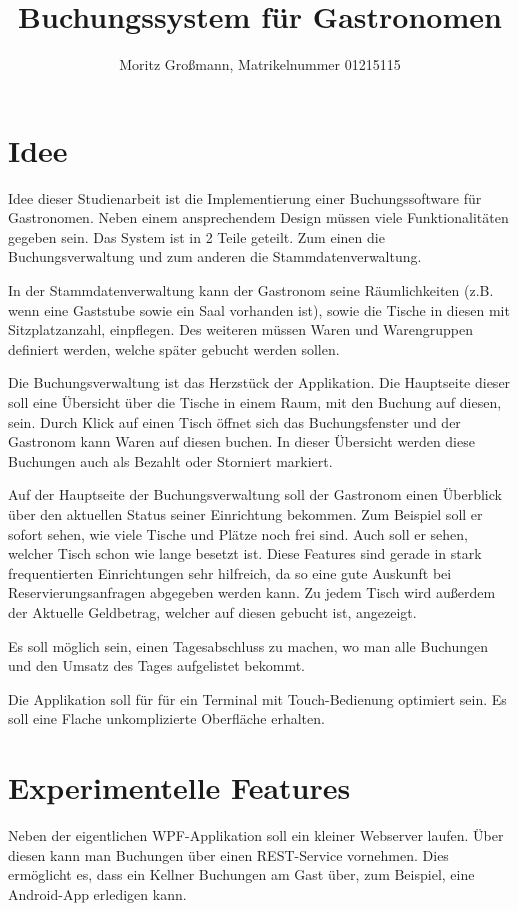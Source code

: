 


	
	\title{Buchungssystem für Gastronomen}
	\author{Moritz Großmann, Matrikelnummer 01215115}
	\maketitle
	
	\section{Idee}
	
	Idee dieser Studienarbeit ist die Implementierung einer Buchungssoftware für Gastronomen. Neben einem ansprechendem Design müssen viele Funktionalitäten gegeben sein. Das System ist in 2 Teile geteilt. Zum einen die Buchungsverwaltung und zum anderen die Stammdatenverwaltung. 
	
	In der Stammdatenverwaltung kann der Gastronom seine Räumlichkeiten (z.B. wenn eine Gaststube sowie ein Saal vorhanden ist), sowie die Tische in diesen mit Sitzplatzanzahl, einpflegen. Des weiteren müssen Waren und Warengruppen definiert werden, welche später gebucht werden sollen. 
	
	Die Buchungsverwaltung ist das Herzstück der Applikation. Die Hauptseite dieser soll eine Übersicht über die Tische in einem Raum, mit den Buchung auf diesen, sein. Durch Klick auf einen Tisch öffnet sich das Buchungsfenster und der Gastronom kann Waren auf diesen buchen. In dieser Übersicht werden diese Buchungen auch als Bezahlt oder Storniert markiert.
	
	Auf der Hauptseite der Buchungsverwaltung soll der Gastronom einen Überblick über den aktuellen Status seiner Einrichtung bekommen. Zum Beispiel soll er sofort sehen, wie viele Tische und Plätze noch frei sind. Auch soll er sehen, welcher Tisch schon wie lange besetzt ist. Diese Features sind gerade in stark frequentierten Einrichtungen sehr hilfreich, da so eine gute Auskunft bei Reservierungsanfragen abgegeben werden kann. Zu jedem Tisch wird außerdem der Aktuelle Geldbetrag, welcher auf diesen gebucht ist, angezeigt. 
	
	Es soll möglich sein, einen Tagesabschluss zu machen, wo man alle Buchungen und den Umsatz des Tages aufgelistet bekommt. 
	
	Die Applikation soll für für ein Terminal mit Touch-Bedienung optimiert sein. Es soll eine Flache unkomplizierte Oberfläche erhalten.
	
	\section{Experimentelle Features}
	
	Neben der eigentlichen WPF-Applikation soll ein kleiner Webserver laufen. Über diesen kann man Buchungen über einen REST-Service vornehmen. Dies ermöglicht es, dass ein Kellner Buchungen am Gast über, zum Beispiel, eine Android-App erledigen kann. 
	
